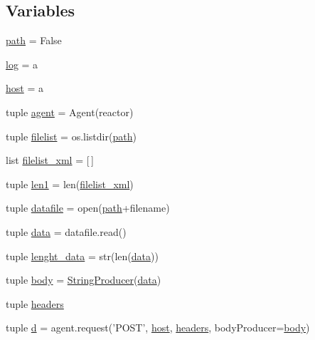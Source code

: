 \subsection*{Variables}
\begin{DoxyCompactItemize}
\item 
\hyperlink{namespaceamon__client__post__events_a027c76dd7a438a9a0ec7bb76a44f9bd2}{path} = False
\item 
\hyperlink{namespaceamon__client__post__events_a03c635092fabd2377d49fc08d83c54ed}{log} = a
\item 
\hyperlink{namespaceamon__client__post__events_a1c1848cdc573caaba7d46953a60f44d4}{host} = a
\item 
tuple \hyperlink{namespaceamon__client__post__events_a9a89e37f5a2f8e40f91be99a5bc5b500}{agent} = Agent(reactor)
\item 
tuple \hyperlink{namespaceamon__client__post__events_a965df8add9147fd407c543b219762f2a}{filelist} = os.\-listdir(\hyperlink{namespaceamon__client__post__events_a027c76dd7a438a9a0ec7bb76a44f9bd2}{path})
\item 
list \hyperlink{namespaceamon__client__post__events_a9b83b7a9506f77788a8ceabdf9c5e126}{filelist\-\_\-xml} = \mbox{[}$\,$\mbox{]}
\item 
tuple \hyperlink{namespaceamon__client__post__events_a4d19062ba6a7999d70e77b4be1893e26}{len1} = len(\hyperlink{namespaceamon__client__post__events_a9b83b7a9506f77788a8ceabdf9c5e126}{filelist\-\_\-xml})
\item 
tuple \hyperlink{namespaceamon__client__post__events_a1b0936a861518a5a9dcf1d57c37bd61f}{datafile} = open(\hyperlink{namespaceamon__client__post__events_a027c76dd7a438a9a0ec7bb76a44f9bd2}{path}+filename)
\item 
tuple \hyperlink{namespaceamon__client__post__events_a15fe42ff6e69403619e0bc52518c867d}{data} = datafile.\-read()
\item 
tuple \hyperlink{namespaceamon__client__post__events_a01c39c83ce37b30cf0fc7c3f3aa779b1}{lenght\-\_\-data} = str(len(\hyperlink{namespaceamon__client__post__events_a15fe42ff6e69403619e0bc52518c867d}{data}))
\item 
tuple \hyperlink{namespaceamon__client__post__events_aeb700347754fd34b279e4d3349177203}{body} = \hyperlink{classamon__client__post__events_1_1_string_producer}{String\-Producer}(\hyperlink{namespaceamon__client__post__events_a15fe42ff6e69403619e0bc52518c867d}{data})
\item 
tuple \hyperlink{namespaceamon__client__post__events_afa009b881ab85a1384666c2f7a2463ac}{headers}
\item 
tuple \hyperlink{namespaceamon__client__post__events_aaa19dceed6887d2592636a2f442429c2}{d} = agent.\-request('P\-O\-S\-T', \hyperlink{namespaceamon__client__post__events_a1c1848cdc573caaba7d46953a60f44d4}{host}, \hyperlink{namespaceamon__client__post__events_afa009b881ab85a1384666c2f7a2463ac}{headers}, body\-Producer=\hyperlink{namespaceamon__client__post__events_aeb700347754fd34b279e4d3349177203}{body})
\end{DoxyCompactItemize}


